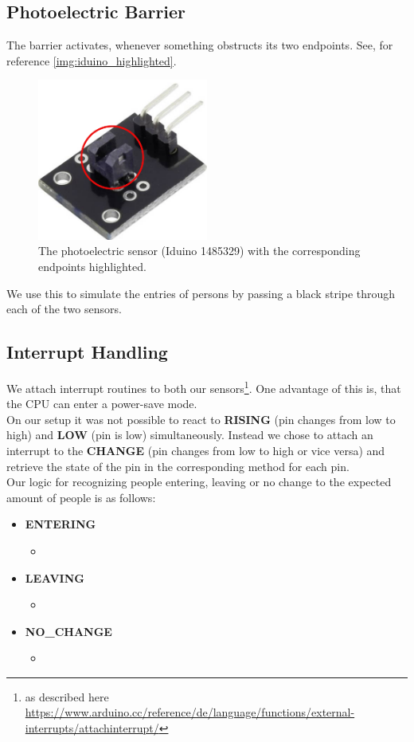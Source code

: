 \documentclass[]{article}
\begin{document}
\begin{sloppypar}
\subsection{Photoelectric Barrier}
The barrier activates, whenever something obstructs its two endpoints. See, for reference \eqref{img:iduino_highlighted}.\\
\begin{figure}[p]
	\centering
	\includegraphics[width=0.5\textwidth, keepaspectratio]{./images/iduino_highlighted.png}
	\caption{The photoelectric sensor (Iduino 1485329) with the corresponding endpoints highlighted.}\label{img:iduino_highlighted}
\end{figure}	
We use this to simulate the entries of persons by passing a black stripe through each of the two sensors.
\subsection{Interrupt Handling}
We attach interrupt routines to both our sensors\footnote{as described here \url{https://www.arduino.cc/reference/de/language/functions/external-interrupts/attachinterrupt/}}. One advantage of this is, that the CPU can enter a power-save mode.\\
On our setup it was not possible to react to \textbf{RISING} (pin changes from low to high) and \textbf{LOW} (pin is low) simultaneously. Instead we chose to attach an interrupt to the \textbf{CHANGE} (pin changes from low to high or vice versa) and retrieve the state of the pin in the corresponding method for each pin.\\
Our logic for recognizing people entering, leaving or no change to the expected amount of people is as follows:
\begin{itemize}
	\item \textbf{ENTERING}
		\begin{itemize}
			\item
		\end{itemize}
	\item \textbf{LEAVING}
		\begin{itemize}
			\item
		\end{itemize}
	\item \textbf{NO\_CHANGE}
		\begin{itemize}
			\item
		\end{itemize}
\end{itemize}
\newpage
\printbibliography

\end{sloppypar}
\end{document}
